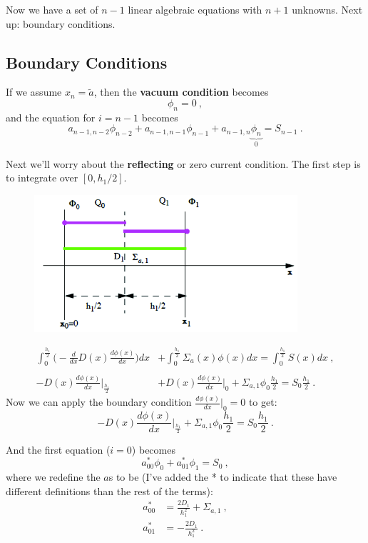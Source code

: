 \documentclass[12pt]{article}
\begin{document}
Now we have a set of $n-1$ linear algebraic equations with $n+1$ unknowns. Next up: boundary conditions.


\subsection*{Boundary Conditions}

If we assume $x_n = \tilde{a}$, then the \textbf{vacuum condition} becomes
\[\phi_n = 0\:,\]
and the equation for $i=n-1$ becomes
\[a_{n-1,n-2} \phi_{n-2} + a_{n-1,n-1}\phi_{n-1} + a_{n-1, n} \underbrace{\phi_{n}}_{0} = S_{n-1}\:.\]

Next we'll worry about the \textbf{reflecting} or zero current condition. The first step is to integrate over $[0, h_{1}/2]$.
%
\begin{figure}[h!]
\includegraphics[height=2in]{ReflectingBC}
\end{figure}
%
\begin{align*}
\int_{0}^{\frac{h_{1}}{2}} \biggl(-\frac{d}{dx}D(x)\frac{d \phi(x)}{dx}\biggr) dx &+ \int_{0}^{\frac{h_{1}}{2}} \Sigma_a(x) \phi(x) dx = \int_{0}^{\frac{h_{1}}{2}} S(x) dx \nonumber \:,\\
%
&\\
%
-D(x)\frac{d \phi(x)}{dx}\big|_{\frac{h_{1}}{2}} &+ D(x)\frac{d \phi(x)}{dx}\big|_{0} + \Sigma_{a,1}\phi_0 \frac{h_1}{2} = S_0 \frac{h_1}{2} \:.\nonumber 
\end{align*}
%
Now we can apply the boundary condition $\frac{d \phi(x)}{dx}\big|_{0} = 0$ to get:
\[-D(x)\frac{d \phi(x)}{dx}\big|_{\frac{h_{1}}{2}} + \Sigma_{a,1}\phi_0 \frac{h_1}{2} = S_0 \frac{h_1}{2}\:.\]

And the first equation ($i=0$) becomes
\[a_{00}^*\phi_0 + a_{01}^* \phi_1 = S_0\:,\]
%
where we redefine the $a$s to be (I've added the * to indicate that these have different definitions than the rest of the terms):
%
\begin{align}
a_{00}^* &= \frac{2D_1}{h_1^2} + \Sigma_{a,1} \:,\nonumber \\
a_{01}^* &= -\frac{2D_1}{h_1^2} \:.\nonumber 
\end{align}
\end{document}
